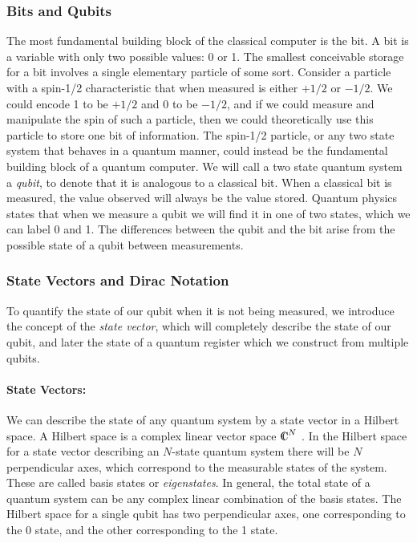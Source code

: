 \subsubsection{Bits and Qubits}

The most fundamental building block of the classical computer is the
bit.  A bit is a variable with only two possible values: 0 or 1.  The
smallest conceivable storage for a bit involves a single elementary
particle of some sort.  Consider a particle with a spin-1/2
characteristic that when measured is either $+1/2$ or $-1/2$.  We
could encode 1 to be $+1/2$ and 0 to be $-1/2$, and if we could
measure and manipulate the spin of such a particle, then we could
theoretically use this particle to store one bit of information.  The
spin-1/2 particle, or any two state system that behaves in a quantum
manner, could instead be the fundamental building block of a quantum
computer.  We will call a two state quantum system a \emph{qubit}, to
denote that it is analogous to a classical bit.  When a classical bit
is measured, the value observed will always be the value stored.
Quantum physics states that when we measure a qubit we will find it in
one of two states, which we can label 0 and 1.  The differences
between the qubit and the bit arise from the possible state of a qubit
between measurements.

\subsubsection{State Vectors and Dirac Notation}

To quantify the state of our qubit when it is not being measured, we
introduce the concept of the \emph{state vector}, which will
completely describe the state of our qubit, and later the state of a
quantum register which we construct from multiple qubits.

\paragraph{State Vectors:} 
We can describe the state of any quantum system by a state vector in a
Hilbert space.  A Hilbert space is a complex linear vector space
$\Complex^{N}$ \cite{williams98quantum}.  In the Hilbert space for a
state vector describing an $N$-state quantum system there will be $N$
perpendicular axes, which correspond to the measurable states of the
system.  These are called basis states or \emph{eigenstates}.  In
general, the total state of a quantum system can be any complex linear
combination of the basis states.  The Hilbert space for a single qubit
has two perpendicular axes, one corresponding to the 0 state, and the
other corresponding to the 1 state.

